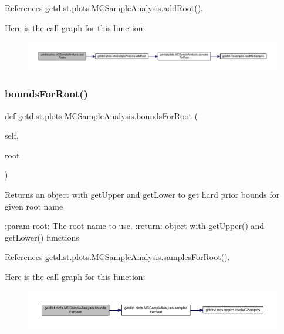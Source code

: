 References getdist.\+plots.\+M\+C\+Sample\+Analysis.\+add\+Root().

Here is the call graph for this function\+:
\nopagebreak
\begin{figure}[H]
\begin{center}
\leavevmode
\includegraphics[width=350pt]{classgetdist_1_1plots_1_1MCSampleAnalysis_adfcdd2464aa89d7c72dbf8f4bf0a04ae_cgraph}
\end{center}
\end{figure}
\mbox{\label{classgetdist_1_1plots_1_1MCSampleAnalysis_a73bb61d8e16c40ed2be4728f8cca5515}} 
\subsubsection{\texorpdfstring{bounds\+For\+Root()}{boundsForRoot()}}
{\footnotesize\ttfamily def getdist.\+plots.\+M\+C\+Sample\+Analysis.\+bounds\+For\+Root (\begin{DoxyParamCaption}\item[{}]{self,  }\item[{}]{root }\end{DoxyParamCaption})}

\begin{DoxyVerb}Returns an object with getUpper and getLower to get hard prior bounds for given root name

:param root: The root name to use.
:return: object with getUpper() and getLower() functions
\end{DoxyVerb}
 

References getdist.\+plots.\+M\+C\+Sample\+Analysis.\+samples\+For\+Root().

Here is the call graph for this function\+:
\nopagebreak
\begin{figure}[H]
\begin{center}
\leavevmode
\includegraphics[width=350pt]{classgetdist_1_1plots_1_1MCSampleAnalysis_a73bb61d8e16c40ed2be4728f8cca5515_cgraph}
\end{center}
\end{figure}
\mbox{\label{classgetdist_1_1plots_1_1MCSampleAnalysis_a84058dd5a8abce27dbe67c1a9544b139}} 
